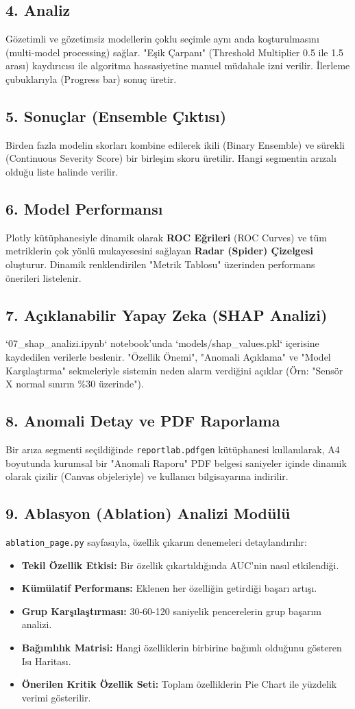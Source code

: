 \documentclass[conference,10pt]{IEEEtran}
\begin{document}
\subsection{4. Analiz}
Gözetimli ve gözetimsiz modellerin çoklu seçimle aynı anda koşturulmasını (multi-model processing) sağlar. "Eşik Çarpanı" (Threshold Multiplier 0.5 ile 1.5 arası) kaydırıcısı ile algoritma hassasiyetine manuel müdahale izni verilir. İlerleme çubuklarıyla (Progress bar) sonuç üretir.
\subsection{5. Sonuçlar (Ensemble Çıktısı)}
Birden fazla modelin skorları kombine edilerek ikili (Binary Ensemble) ve sürekli (Continuous Severity Score) bir birleşim skoru üretilir. Hangi segmentin arızalı olduğu liste halinde verilir.
\subsection{6. Model Performansı}
Plotly kütüphanesiyle dinamik olarak \textbf{ROC Eğrileri} (ROC Curves) ve tüm metriklerin çok yönlü mukayesesini sağlayan \textbf{Radar (Spider) Çizelgesi} oluşturur. Dinamik renklendirilen "Metrik Tablosu" üzerinden performans önerileri listelenir.
\subsection{7. Açıklanabilir Yapay Zeka (SHAP Analizi)}
`07_shap_analizi.ipynb` notebook'unda `models/shap_values.pkl` içerisine kaydedilen verilerle beslenir. "Özellik Önemi", "Anomali Açıklama" ve "Model Karşılaştırma" sekmeleriyle sistemin neden alarm verdiğini açıklar (Örn: "Sensör X normal sınırın \%30 üzerinde").
\subsection{8. Anomali Detay ve PDF Raporlama}
Bir arıza segmenti seçildiğinde \texttt{reportlab.pdfgen} kütüphanesi kullanılarak, A4 boyutunda kurumsal bir "Anomali Raporu" PDF belgesi saniyeler içinde dinamik olarak çizilir (Canvas objeleriyle) ve kullanıcı bilgisayarına indirilir.
\subsection{9. Ablasyon (Ablation) Analizi Modülü}
\texttt{ablation\_page.py} sayfasıyla, özellik çıkarım denemeleri detaylandırılır:
\begin{itemize}
    \item \textbf{Tekil Özellik Etkisi:} Bir özellik çıkartıldığında AUC'nin nasıl etkilendiği.
    \item \textbf{Kümülatif Performans:} Eklenen her özelliğin getirdiği başarı artışı.
    \item \textbf{Grup Karşılaştırması:} 30-60-120 saniyelik pencerelerin grup başarım analizi.
    \item \textbf{Bağımlılık Matrisi:} Hangi özelliklerin birbirine bağımlı olduğunu gösteren Isı Haritası.
    \item \textbf{Önerilen Kritik Özellik Seti:} Toplam özelliklerin Pie Chart ile yüzdelik verimi gösterilir.
\end{itemize}
\end{document}
